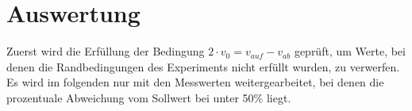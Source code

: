 \section{Auswertung}
\label{sec:Auswertung}



Zuerst wird die Erfüllung der Bedingung $2 \cdot v_0 = v_{auf} - v_{ab}$ geprüft, um Werte, bei denen die Randbedingungen
des Experiments nicht erfüllt wurden, zu verwerfen. Es wird im folgenden nur mit den Messwerten weitergearbeitet, bei denen die 
prozentuale Abweichung vom Sollwert bei unter 50\% liegt. \\

